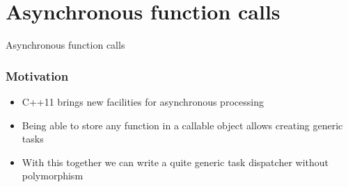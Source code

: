 \documentclass{beamer}
\begin{document}
\section{Asynchronous function calls}


\begin{frame}
    \begin{center}
        Asynchronous function calls
    \end{center}
\end{frame}

\begin{frame}
\frametitle{Motivation}
    \begin{itemize}
        \item C++11 brings new facilities for asynchronous processing
        \pause
        \item Being able to store any function in a callable object allows creating generic tasks
        \item With this together we can write a quite generic task dispatcher without polymorphism
    \end{itemize}
\end{frame}
\end{document}
